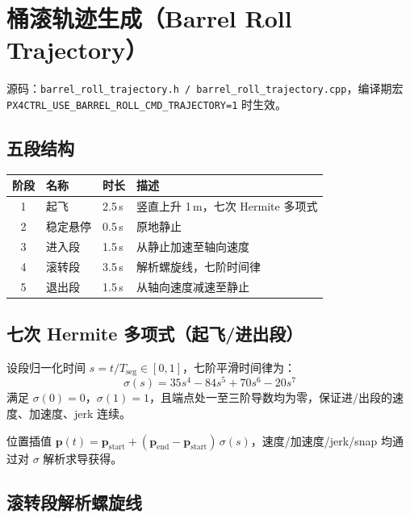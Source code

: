 \documentclass[UTF8, a4paper, 11pt]{ctexart}
\newcommand{\bp}{\mathbf{p}}
\begin{document}
\section{桶滚轨迹生成（Barrel Roll Trajectory）}

源码：\texttt{barrel\_roll\_trajectory.h / barrel\_roll\_trajectory.cpp}，编译期宏 \texttt{PX4CTRL\_USE\_BARREL\_ROLL\_CMD\_TRAJECTORY=1} 时生效。

\subsection{五段结构}

\begin{center}
\begin{tabular}{clll}
\toprule
阶段 & 名称 & 时长 & 描述 \\
\midrule
1 & 起飞    & 2.5\,s & 竖直上升 1\,m，七次 Hermite 多项式 \\
2 & 稳定悬停 & 0.5\,s & 原地静止 \\
3 & 进入段  & 1.5\,s & 从静止加速至轴向速度 \\
4 & 滚转段  & 3.5\,s & 解析螺旋线，七阶时间律 \\
5 & 退出段  & 1.5\,s & 从轴向速度减速至静止 \\
\bottomrule
\end{tabular}
\end{center}

\subsection{七次 Hermite 多项式（起飞/进出段）}

设段归一化时间 $s = t/T_{\text{seg}} \in [0,1]$，七阶平滑时间律为：
\begin{equation}
  \sigma(s) = 35s^4 - 84s^5 + 70s^6 - 20s^7
\end{equation}
满足 $\sigma(0)=0$，$\sigma(1)=1$，且端点处一至三阶导数均为零，保证进/出段的速度、加速度、jerk 连续。

位置插值 $\bp(t) = \bp_{\text{start}} + (\bp_{\text{end}}-\bp_{\text{start}})\,\sigma(s)$，速度/加速度/jerk/snap 均通过对 $\sigma$ 解析求导获得。

\subsection{滚转段解析螺旋线}
\end{document}
